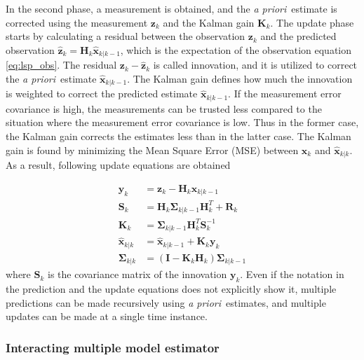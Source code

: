 \documentclass[english, 12pt, a4paper, elec, utf8, a-1b, online]{aaltothesis}
\numberwithin{equation}{section}
\renewcommand{\vec}[1]{\mathbf{#1}}
\newcommand{\inv}[1]{#1^{-1}}
\newcommand{\xprior}{\hat{\vec{x}}_{k|k-1}}
\newcommand{\xpost}{\hat{\vec{x}}_{k|k}}
\newcommand{\priorecov}{\boldsymbol{\Sigma}_{k|k-1}}
\newcommand{\postecov}{\boldsymbol{\Sigma}_{k|k}}
\newcommand{\prefitinnov}{\vec{y}_k}
\newcommand{\x}{\vec{x}_k}
\newcommand{\z}{\vec{z}_k}
\newcommand{\omodel}{\vec{H}_k}
\newcommand{\ocov}{\vec{R}_k}
\newcommand{\innocov}{\vec{S}_k}
\newcommand{\eye}{\vec{I}}
\newcommand{\gain}{\vec{K}_k}
\def\prior{\textit{a priori}\ }
\newcommand{\zhat}{\hat{\vec{z}}_k}
\begin{document}
In the second phase, a measurement is obtained, and the \prior estimate is corrected using the measurement $\z$ and the Kalman gain $\gain$.
The update phase starts by calculating a residual between the observation $\z$ and the predicted observation $\zhat = \omodel \xprior$, which is the expectation of the observation equation \eqref{eq:lsp_obs}.
The residual $\z-\zhat$ is called innovation, and it is utilized to correct the \prior estimate $\xprior$.
The Kalman gain defines how much the innovation is weighted to correct the predicted estimate $\xprior$.
If the measurement error covariance is high, the measurements can be trusted less compared to the situation where the measurement error covariance is low.
Thus in the former case, the Kalman gain corrects the estimates less than in the latter case.
The Kalman gain is found by minimizing the Mean Square Error (MSE) between $\x$ and $\xpost$.
As a result, following update equations are obtained \cite{Zarchan2000}

\begin{align}
    \prefitinnov &= \z - \omodel \xprior \label{eq:kf_prefit_innov}\\ 
    \innocov &= \omodel \priorecov \omodel^T + \ocov \label{eq:kf_innov_cov}\\ 
    \gain &= \priorecov \omodel^T \inv{\innocov} \label{eq:kf_gain}\\ 
    \xpost &= \xprior + \gain \prefitinnov \label{eq:kf_update_x}\\ 
    \postecov &= \left( \eye - \gain \omodel \right) \priorecov  \label{eq:kf_post_error_cov}
\end{align}
where $\innocov$ is the covariance matrix of the innovation $\prefitinnov$. 
Even if the notation in the prediction and the update equations does not explicitly show it, multiple predictions can be made recursively using \prior estimates, and multiple updates can be made at a single time instance.

\subsubsection{Interacting multiple model estimator}
\label{sec:IMM}
\end{document}
